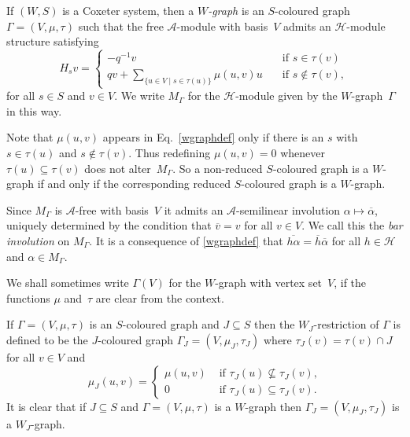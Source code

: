 \documentclass[10pt]{amsart}
\theoremstyle{definition}
\begin{document}
If $(W,S)$ is a Coxeter system, then a \emph{$W\!$-graph} is
an $S$-coloured graph $\Gamma=(V, \mu, \tau)$ such that the free
$\mathcal{A}$-module with basis~$V$ admits an $\mathcal{H}$-module
structure satisfying
\begin{equation}\label{wgraphdef}
 H_{s}v = \begin{cases}
 -q^{-1}v \quad &\text{if $s \in \tau(v)$}\\
 qv + \sum_{\{u \in V \mid s \in \tau(u)\}}\mu(u,v)u
 \quad &\text{if $s \notin \tau(v)$},
 \end{cases}
\end{equation}
for all $s \in S$ and $v \in V\!$.
We write $M_\Gamma$ for the $\mathcal{H}$-module given by
the $W\!$-graph~$\Gamma$ in this way.

Note that $\mu(u,v)$ appears in Eq.~\eqref{wgraphdef} only if there is an $s$
with $s\in\tau(u)$ and $s\notin\tau(v)$. Thus redefining $\mu(u,v)=0$
whenever $\tau(u)\subseteq \tau(v)$ does not alter~$M_\Gamma$.
So a non-reduced $S$-coloured graph is a $W$-graph if and only if the
corresponding reduced $S$-coloured graph is a $W$-graph.

Since $M_\Gamma$
is $\mathcal{A}$-free with basis~$V$ it admits an
$\mathcal{A}$-semilinear involution $\alpha \mapsto \overline{\alpha}$,
uniquely determined by the condition
that $\overline v=v$ for all $v\in V$. We call this the
\emph{bar involution} on $M_\Gamma$. It is a consequence of
\eqref{wgraphdef} that $\overline{h\alpha}=\overline{h}\overline{\alpha}$
for all $h\in \mathcal{H}$ and $\alpha \in M_\Gamma$.

We shall sometimes write $\Gamma(V)$ for the $W\!$-graph with vertex
set~$V\!$, if the functions $\mu$ and~$\tau$ are clear from the context.

If $\Gamma=(V,\mu,\tau)$ is an $S$-coloured graph and $J\subseteq S$ then
the $W_J$-restriction of $\Gamma$ is defined to be the $J$-coloured graph
$\Gamma_{J} = (V,\mu_J,\tau_J)$
where $\tau_J(v)=\tau(v)\cap J$ for all $v\in V$ and
\[
\mu_J(u,v)=
\begin{cases}
\mu(u,v)&\text{ if $\tau_J(u)\nsubseteq \tau_J(v)$,}\\
0&\text{ if $\tau_J(u)\subseteq \tau_J(v)$.}
\end{cases}
\]
It is clear that if $J\subseteq S$ and $\Gamma=(V,\mu,\tau)$ is a
$W\!$-graph then $\Gamma_J=(V,\mu_J,\tau_J)$ is a $W_J$-graph.
\end{document}
